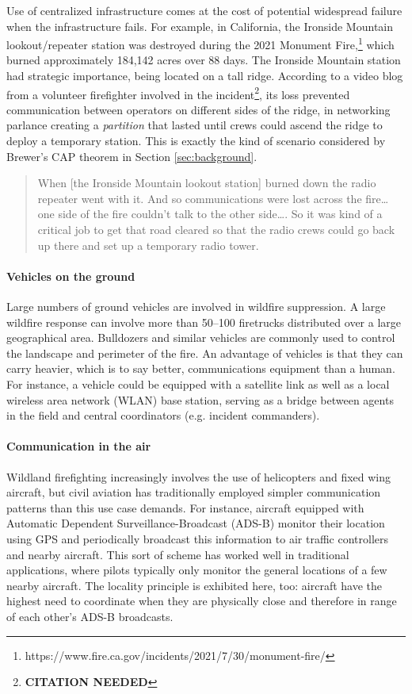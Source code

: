 \documentclass[]             %
{NASA}                       %
\theoremstyle{definition}
\newcommand{\citationneeded}{\footnote{\textbf{CITATION NEEDED}}}
\begin{document}
Use of centralized infrastructure comes at the cost of potential
widespread failure when the infrastructure fails. For example, in
California, the Ironside Mountain lookout/repeater station was destroyed
during the 2021 Monument Fire,\footnote{https://www.fire.ca.gov/incidents/2021/7/30/monument-fire/}
which burned approximately 184,142 acres over 88 days. The Ironside
Mountain station had strategic importance, being located on a tall
ridge. According to a video blog from a volunteer firefighter involved
in the incident\citationneeded, its loss prevented communication between
operators on different sides of the ridge, in networking parlance
creating a \emph{partition} that lasted until crews could ascend the
ridge to deploy a temporary station. This is exactly the kind of
scenario considered by Brewer's CAP theorem in Section
\ref{sec:background}.

\begin{quote}
  When {[}the Ironside Mountain lookout station{]} burned down the radio
  repeater went with it. And so communications were lost across the
  fire\ldots{} one side of the fire couldn't talk to the other side\ldots.
  So it was kind of a critical job to get that road cleared so that the
  radio crews could go back up there and set up a temporary radio tower.
\end{quote}

\paragraph{Vehicles on the ground}
Large numbers of ground vehicles are involved in wildfire
suppression. A large wildfire response can involve more than 50--100
firetrucks distributed over a large geographical area. Bulldozers and
similar vehicles are commonly used to control the landscape and
perimeter of the fire. An advantage of vehicles is that they can carry
heavier, which is to say better, communications equipment than a
human. For instance, a vehicle could be equipped with a satellite link
as well as a local wireless area network (WLAN) base station, serving
as a bridge between agents in the field and central coordinators
(e.g. incident commanders).

\paragraph{Communication in the air}

Wildland firefighting increasingly involves the use of helicopters and
fixed wing aircraft, but civil aviation has traditionally employed
simpler communication patterns than this use case demands. For instance,
aircraft equipped with Automatic Dependent Surveillance-Broadcast
(ADS-B) monitor their location using GPS and periodically broadcast this
information to air traffic controllers and nearby aircraft. This sort of
scheme has worked well in traditional applications, where pilots
typically only monitor the general locations of a few nearby aircraft.
The locality principle is exhibited here, too: aircraft have the highest
need to coordinate when they are physically close and therefore in range
of each other's ADS-B broadcasts.
\end{document}
